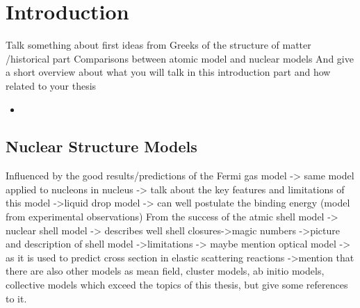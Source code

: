 \section{Introduction}
Talk something about first ideas from Greeks of the structure of matter /historical part
Comparisons between atomic model and nuclear models
And give a short overview about what you will talk in this introduction part and how related to your thesis
\begin{itemize}
\item 
\end{itemize}
\subsection{Nuclear Structure Models}
Influenced by the good results/predictions of the Fermi gas model -> same model applied to nucleons in nucleus
-> talk about the key features and limitations of this model
->liquid drop model -> can well postulate the binding energy (model from experimental observations)
From the success of the atmic shell model -> nuclear shell model
-> describes well shell closures->magic numbers
->picture and description of shell model
->limitations
-> maybe mention optical model -> as it is used to predict cross section in elastic scattering reactions
->mention that  there are also other models as mean field, cluster models, ab initio models, collective models which exceed the topics of this thesis, but give some references to it.
